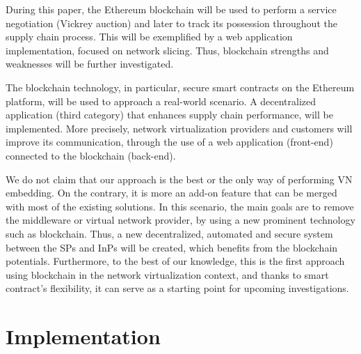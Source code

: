 During this paper, the Ethereum blockchain will be used to perform a service negotiation (Vickrey auction) and later to track its possession throughout the supply chain process. This will be exemplified by a web application implementation, focused on network slicing. Thus, blockchain strengths and weaknesses will be further investigated.

The blockchain technology, in particular, secure smart contracts on the Ethereum platform, will be used to approach a real-world scenario. A decentralized application (third category) that enhances supply chain performance, will be implemented. More precisely, network virtualization providers and customers will improve its communication, through the use of a web application (front-end) connected to the blockchain (back-end).

We do not claim that our approach is the best or the only way
of performing VN embedding. On the contrary, it is more an add-on feature that can be merged with most of the existing solutions. In this scenario, the main goals are to remove the middleware or virtual network provider, by using a new prominent technology such as blockchain. Thus, a new decentralized, automated and secure system between the SPs and InPs will be created, which benefits from the blockchain potentials. Furthermore, to the best of our knowledge, this is the first approach using blockchain in the network virtualization context, and thanks to smart contract's flexibility, it can serve as a starting point for upcoming investigations.

\chapter{Implementation}
\label{ch:implementation}


